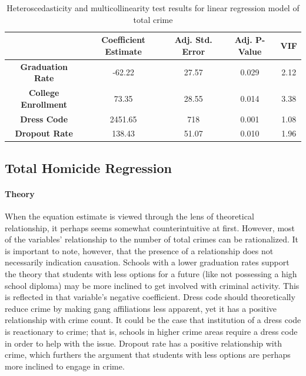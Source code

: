 \documentclass[12pt]{article}
\begin{document}
	\begin{center}
		\begin{table}[h]
			\begin{tabular}{ c | c | c | c | c }
				
				& \textbf{Coefficient Estimate} & \textbf{Adj. Std. Error} & \textbf{Adj. P-Value} & \textbf{VIF} \\
				\hline
				\textbf{Graduation Rate} & -62.22 & 27.57 & 0.029 & 2.12  \\
				\textbf{College Enrollment} & 73.35 & 28.55 & 0.014 & 3.38 \\
				\textbf{Dress Code} & 2451.65 & 718 & 0.001 & 1.08 \\
				\textbf{Dropout Rate} & 138.43 & 51.07 & 0.010 & 1.96
				
			\end{tabular}
			\caption{Heteroscedasticity and multicollinearity test results for linear regression model of total crime}
		\end{table}
	\end{center}
	

	\subsection{Total Homicide Regression}

	\paragraph{Theory}
	When the equation estimate is viewed through the lens of theoretical relationship, it perhaps seems somewhat counterintuitive at first.  However, most of the variables' relationship to the number of total crimes can be rationalized.  It is important to note, however, that the presence of a relationship does not necessarily indication causation.  Schools with a lower graduation rates support the theory that students with less options for a future (like not possessing a high school diploma) may be more inclined to get involved with criminal activity.  This is reflected in that variable's negative coefficient.  Dress code should theoretically reduce crime by making gang affiliations less apparent, yet it has a positive relationship with crime count.  It could be the case that institution of a dress code is reactionary to crime; that is, schools in higher crime areas require a dress code in order to help with the issue.  Dropout rate has a positive relationship with crime, which furthers the argument that students with less options are perhaps more inclined to engage in crime.
	
\end{document}

